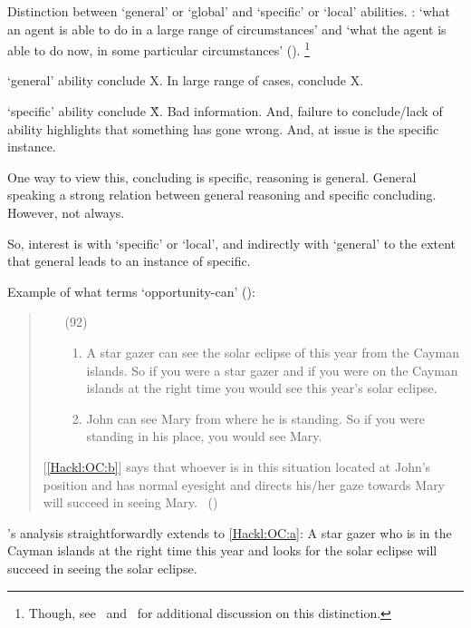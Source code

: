 \begin{note}
  \nocite{Maier:2018uo}
  Distinction between `general' or `global' and `specific' or `local' abilities.
  \citeauthor{Whittle:2010wr}: `what an agent is able to do in a large range of circumstances' and `what the agent is able to do now, in some particular circumstances' (\citeyear[2]{Whittle:2010wr}).%
  \footnote{
    Though, see~\textcite[esp.\ \S4]{Kittle:2015tb} and~\textcite[1--2]{Kikkert:2022wp} for additional discussion on this distinction.
  }

  `general' ability conclude X.
  In large range of cases, conclude X.

  `specific' ability conclude \~X.
  Bad information.
  And, failure to conclude/lack of ability highlights that something has gone wrong.
  And, at issue is the specific instance.

  One way to view this, concluding is specific, reasoning is general.
  General speaking a strong relation between general reasoning and specific concluding.
  However, not always.

  So, interest is with `specific' or `local', and indirectly with `general' to the extent that general leads to an instance of specific.

  Example of what \textcite{Hackl:1998tt} terms `opportunity-can' (\citeyear[14]{Hackl:1998tt}):

  \begin{quote}
    \begin{enumerate}
    \item[(92)]
      \begin{enumerate}[label=\alph*., ref=(\alph*)]
      \item
        \label{Hackl:OC:a}
        A star gazer can see the solar eclipse of this year from the Cayman islands.\newline
        So if you were a star gazer and if you were on the Cayman islands at the right time you would see this year's solar eclipse.
      \item
        \label{Hackl:OC:b}
        John can see Mary from where he is standing.\newline
        So if you were standing in his place, you would see Mary.
      \end{enumerate}
    \end{enumerate}

    [\ref{Hackl:OC:b}] says that whoever is in this situation located at John's position and has normal eyesight and directs his/her gaze towards Mary will succeed in seeing Mary.%
    \mbox{ }\hfill\mbox{(\citeyear[39]{Hackl:1998tt})}
  \end{quote}
  \citeauthor{Hackl:1998tt}'s analysis straightforwardly extends to \ref{Hackl:OC:a}:
  A star gazer who is in the Cayman islands at the right time this year and looks for the solar eclipse will succeed in seeing the solar eclipse.


\end{note}
